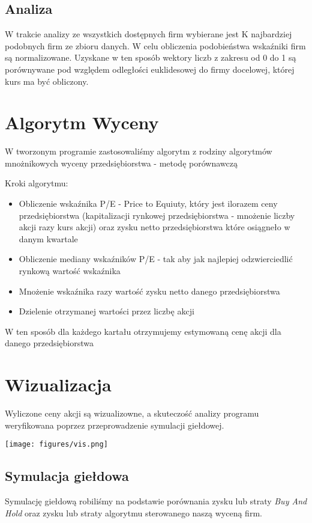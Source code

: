 \subsection{Analiza}
W trakcie analizy ze wszystkich dostępnych firm wybierane jest K najbardziej podobnych
firm ze zbioru danych.
W celu obliczenia podobieństwa wskaźniki firm są normalizowane.
Uzyskane w ten sposób wektory liczb z zakresu od 0 do 1 są porównywane pod względem
odległości euklidesowej do firmy docelowej, której kurs ma być obliczony.
\section{Algorytm Wyceny}
W tworzonym programie zastosowaliśmy algorytm z rodziny algorytmów mnożnikowych wyceny przedsiębiorstwa - metodę porównawczą

Kroki algorytmu:
\begin{itemize}
	\item Obliczenie wskaźnika P/E - Price to Equiuty, który jest ilorazem ceny przedsiębiorstwa (kapitalizacji rynkowej przedsiębiorstwa - mnożenie liczby akcji razy kurs akcji) oraz zysku netto przedsiębiorstwa które osiągneło w danym kwartale
	\item Obliczenie mediany wskaźników P/E - tak aby jak najlepiej odzwierciedlić rynkową wartość wskaźnika
	\item Mnożenie wskaźnika razy wartość zysku netto danego przedsiębiorstwa
	\item Dzielenie otrzymanej wartości przez liczbę akcji
\end{itemize}
W ten sposób dla każdego kartału otrzymujemy estymowaną cenę akcji dla danego przedsiębiorstwa
\section{Wizualizacja}
Wyliczone ceny akcji są wizualizowne, a skuteczość analizy programu weryfikowana poprzez
przeprowadzenie symulacji giełdowej.

\begin{center}
	\texttt{[image: figures/vis.png]}\\
\end{center}

\subsection{Symulacja giełdowa}
Symulację giełdową robiliśmy na podstawie porównania zysku lub straty \textit{Buy And Hold} oraz zysku lub straty algorytmu sterowanego naszą wyceną firm. 
